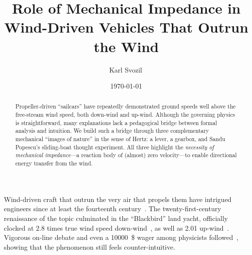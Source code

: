 \documentclass[reprint,aps,pra,superscriptaddress,longbibliography]{revtex4-2}
\begin{document}
\title{Role of Mechanical Impedance in Wind-Driven Vehicles That Outrun the Wind}

\author{Karl Svozil\,}

\date{\today}

\begin{abstract}
Propeller-driven ``sailcars'' have repeatedly demonstrated ground speeds well above the free-stream wind speed, both down-wind and up-wind. Although the governing physics is straightforward, many explanations lack a pedagogical bridge between formal analysis and intuition.  We build such a bridge through three complementary mechanical ``images of nature'' in the sense of Hertz: a lever, a gearbox, and Sandu Popescu's sliding-boat thought experiment. All three highlight the \emph{necessity of mechanical impedance}---a reaction body of (almost) zero velocity---to enable directional energy transfer from the wind.
\end{abstract}

\maketitle

Wind-driven craft that outrun the very air that propels them
have intrigued engineers since at least the fourteenth century~\cite{mcdonald2021}.
The twenty-first-century renaissance of the topic culminated in the ``Blackbird''
land yacht, officially clocked at \num{2.8} times true wind speed
down-wind~\cite{nalsa2010}, as well as \num{2.01}  up-wind~\cite{blackbird2011-casterttw}.  Vigorous on-line debate and even a
\SI{10000}{\$} wager among physicists followed~\cite{veritasium2021,VeritasiumWager2021}, showing
that the phenomenon still feels counter-intuitive.
\end{document}
